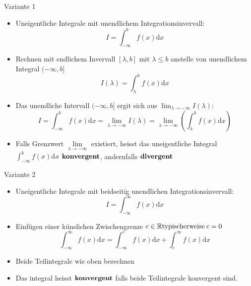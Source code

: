\begin{KR}{Variante 1}
	\begin{itemize}
		\item Uneigentliche Integrale mit unendlichem Integrationsinvervall:
		\[I=\int_{-\infty}^b{f(x)\mathrm{d}x} \]
		\item Rechnen mit endlichem Invervall \([\lambda,b] \text{ mit } \lambda \le b \) anstelle von unendlichem
			Integral \((-\infty,b] \)
			\[I(\lambda)=\int_{\lambda}^b{f(x)\mathrm{d}x} \]
		\item Das unendliche Intervall \((-\infty,b] \) ergit sich aus \(\lim_{\lambda \rightarrow
			-\infty}I(\lambda) \):
			\[I=\int_{-\infty}^b{f(x)\mathrm{d}x}=\underset{\lambda \rightarrow -\infty}{\lim}I(\lambda)=
			\underset{\lambda \rightarrow -\infty}{\lim}\left(\int_{\lambda}^b{f(x)\mathrm{d}x}\right) \]
		\item Falls Grenzwert \(\underset{\lambda \rightarrow -\infty}{\lim}\) existiert, heisst das uneigentliche
			Integral \(\displaystyle\int_{-\infty}^b{f(x)\mathrm{d}x}\) \(\bold{konvergent}\), andernfalls 
			\(\bold{divergent}\)
	\end{itemize}
\end{KR}

\begin{KR}{Variante 2}
\begin{itemize}
	\item Uneigentliche Integrale mit beidseitig unendlichen Integrationsinvervall:
		\[I=\int_{-\infty}^{\infty}{f(x)\mathrm{d}x}\]
	\item Einfügen einer künslichen Zwischengrenze \(c \in \mathbb{R}\\\text{typischerweise}\:c=0 \)
		\[\int_{-\infty}^{\infty}{f(x)\mathrm{d}x}=\int_{-\infty}^{c}{f(x)\mathrm{d}x}+\int_c^{\infty}
		{f(x)\mathrm{d}x} \]
	\item Beide Teilintegrale wie oben berechnen
	\item Das integral heisst \(\bold{konvergent}\) falls beide Teilintegrale konvergent sind.
\end{itemize}
\end{KR}

